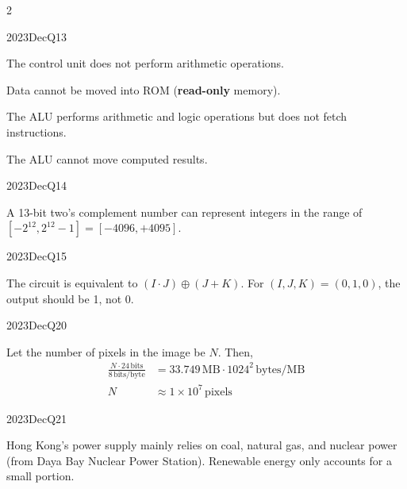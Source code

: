 \begin{multicols}{2}
\begin{qsolution}{2023}{Dec}{Q13}{\tgCE \tgCEComputerOrganisation}
    
    \begin{enumualpha}
        \item The control unit does not perform arithmetic operations.
        \item Data cannot be moved into ROM (\textbf{read-only} memory).
        \item The ALU performs arithmetic and logic operations but does not fetch instructions.
        \item[(E)] The ALU cannot move computed results.
    \end{enumualpha}
\end{qsolution}

\begin{qsolution}{2023}{Dec}{Q14}{\tgCE \tgCETwosComplement}

    A 13-bit two's complement number can represent integers in the range of $[-2^{12}, 2^{12}-1]=[-4096,+4095]$.
\end{qsolution}

\begin{qsolution}{2023}{Dec}{Q15}{\tgCE \tgCELogicalCircuits}

    The circuit is equivalent to $(I\cdot J)\oplus(J+K)$.
    For $(I,J,K)=(0,1,0)$, the output should be 1, not 0.
\end{qsolution}

\begin{qsolution}[10]{2023}{Dec}{Q20}{\tgCE}

    Let the number of pixels in the image be $N$.
    Then, \begin{align*}
        \frac{N\cdot 24\,\mathrm{bits}}{8\,\mathrm{bits/byte}} &= 33.749\,\mathrm{MB}\cdot 1024^2\,\mathrm{bytes/MB}\\
        N &\approx 1\times10^7\,\mathrm{pixels}
    \end{align*}
\end{qsolution}

\begin{qsolution}{2023}{Dec}{Q21}{\tgEE \tgEEPowerSystems}

    Hong Kong's power supply mainly relies on coal, natural gas, and nuclear power (from Daya Bay Nuclear Power Station).
    Renewable energy only accounts for a small portion.
\end{qsolution}


\end{multicols}

